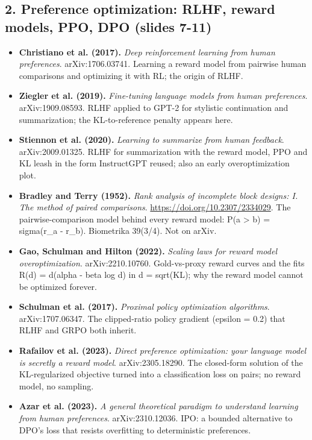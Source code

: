 \documentclass[11pt,letterpaper]{article}
\begin{document}
\subsection*{2. Preference optimization: RLHF, reward models, PPO, DPO (slides 7-11)}
\begin{itemize}[leftmargin=1.2em,itemsep=3pt]\sloppy
\item \textbf{Christiano et al. (2017).} \textit{Deep reinforcement learning from human preferences}. arXiv:1706.03741. Learning a reward model from pairwise human comparisons and optimizing it with RL; the origin of RLHF.
\item \textbf{Ziegler et al. (2019).} \textit{Fine-tuning language models from human preferences}. arXiv:1909.08593. RLHF applied to GPT-2 for stylistic continuation and summarization; the KL-to-reference penalty appears here.
\item \textbf{Stiennon et al. (2020).} \textit{Learning to summarize from human feedback}. arXiv:2009.01325. RLHF for summarization with the reward model, PPO and KL leash in the form InstructGPT reused; also an early overoptimization plot.
\item \textbf{Bradley and Terry (1952).} \textit{Rank analysis of incomplete block designs: I. The method of paired comparisons}. \url{https://doi.org/10.2307/2334029}. The pairwise-comparison model behind every reward model: P(a > b) = sigma(r\_a - r\_b). Biometrika 39(3/4). Not on arXiv.
\item \textbf{Gao, Schulman and Hilton (2022).} \textit{Scaling laws for reward model overoptimization}. arXiv:2210.10760. Gold-vs-proxy reward curves and the fits R(d) = d(alpha - beta log d) in d = sqrt(KL); why the reward model cannot be optimized forever.
\item \textbf{Schulman et al. (2017).} \textit{Proximal policy optimization algorithms}. arXiv:1707.06347. The clipped-ratio policy gradient (epsilon = 0.2) that RLHF and GRPO both inherit.
\item \textbf{Rafailov et al. (2023).} \textit{Direct preference optimization: your language model is secretly a reward model}. arXiv:2305.18290. The closed-form solution of the KL-regularized objective turned into a classification loss on pairs; no reward model, no sampling.
\item \textbf{Azar et al. (2023).} \textit{A general theoretical paradigm to understand learning from human preferences}. arXiv:2310.12036. IPO: a bounded alternative to DPO's loss that resists overfitting to deterministic preferences.

\end{itemize}
\end{document}
